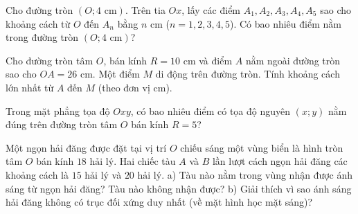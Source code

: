 \begin{bt}%
	Cho đường tròn $(O; 4\text{ cm})$. Trên tia $Ox$, lấy các điểm $A_1, A_2, A_3, A_4, A_5$ sao cho khoảng cách từ $O$ đến $A_n$ bằng $n\text{ cm}$ ($n=1, 2, 3, 4, 5$). Có bao nhiêu điểm nằm trong đường tròn $(O; 4\text{ cm})$?
\end{bt}

\begin{bt}%
	Cho đường tròn tâm $O$, bán kính $R = 10\text{ cm}$ và điểm $A$ nằm ngoài đường tròn sao cho $OA = 26\text{ cm}$. Một điểm $M$ di động trên đường tròn. Tính khoảng cách lớn nhất từ $A$ đến $M$ (theo đơn vị cm).
\end{bt}

\begin{bt}%
	Trong mặt phẳng tọa độ $Oxy$, có bao nhiêu điểm có tọa độ nguyên $(x; y)$ nằm đúng trên đường tròn tâm $O$ bán kính $R = 5$?
\end{bt}

\begin{bt}%
	Một ngọn hải đăng được đặt tại vị trí $O$ chiếu sáng một vùng biển là hình tròn tâm $O$ bán kính $18\text{ hải lý}$. Hai chiếc tàu $A$ và $B$ lần lượt cách ngọn hải đăng các khoảng cách là $15\text{ hải lý}$ và $20\text{ hải lý}$. 
	a) Tàu nào nằm trong vùng nhận được ánh sáng từ ngọn hải đăng? Tàu nào không nhận được?
	b) Giải thích vì sao ánh sáng hải đăng không có trục đối xứng duy nhất (về mặt hình học mặt sáng)?
\end{bt}
